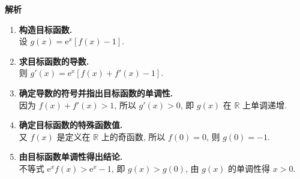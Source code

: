 \documentclass{article}
\begin{document}
\noindent \textbf{解析}
\begin{enumerate}
    \item[\textbf{第一步:}] \textbf{构造目标函数.} \\
    设 \(g(x) = \mathrm{e}^x [f(x) - 1]\).

    \item[\textbf{第二步:}] \textbf{求目标函数的导数.} \\
    则 \(g'(x) = \mathrm{e}^x [f(x) + f'(x) - 1]\).

    \item[\textbf{第三步:}] \textbf{确定导数的符号并指出目标函数的单调性.} \\
    因为 \(f(x) + f'(x) > 1\), 所以 \(g'(x) > 0\), 即 \(g(x)\) 在 \(\mathbb{R}\) 上单调递增.

    \item[\textbf{第四步:}] \textbf{确定目标函数的特殊函数值.} \\
    又 \(f(x)\) 是定义在 \(\mathbb{R}\) 上的奇函数, 所以 \(f(0) = 0\), 则 \(g(0) = -1\).

    \item[\textbf{第五步:}] \textbf{由目标函数单调性得出结论.} \\
    不等式 \(\mathrm{e}^x f(x) > \mathrm{e}^x - 1\), 即 \(g(x) > g(0)\), 由 \(g(x)\) 的单调性得 \(x > 0\).
\end{enumerate}
\end{document}
